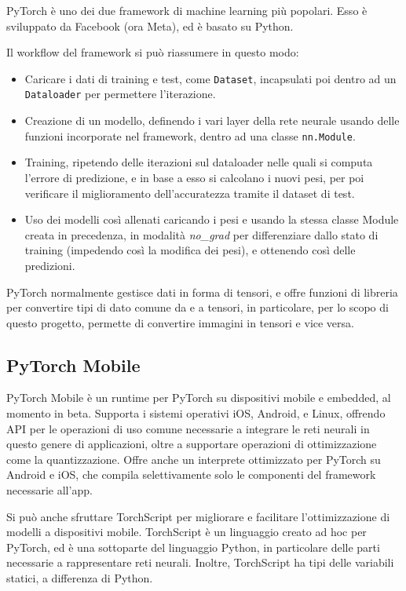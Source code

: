 PyTorch è uno dei due framework di machine learning più popolari.
Esso è sviluppato da Facebook (ora Meta), ed è basato su Python.

Il workflow del framework si può riassumere in questo modo:

\begin{itemize}
    \item Caricare i dati di training e test, come \texttt{Dataset}, 
    incapsulati poi dentro ad un \texttt{Dataloader} per permettere l'iterazione.
    \item Creazione di un modello, definendo i vari layer della rete neurale usando
    delle funzioni incorporate nel framework, dentro ad una classe \texttt{nn.Module}.
    \item Training, ripetendo delle iterazioni sul dataloader nelle quali si computa
    l'errore di predizione, e in base a esso si calcolano i nuovi pesi, per poi verificare
    il miglioramento dell'accuratezza tramite il dataset di test.
    \item Uso dei modelli così allenati caricando i pesi e usando la stessa classe Module
    creata in precedenza, in modalità \emph{no\_grad} per differenziare dallo stato di
    training (impedendo così la modifica dei pesi), e ottenendo così delle predizioni.
\end{itemize}

PyTorch normalmente gestisce dati in forma di tensori, e offre funzioni di libreria per
convertire tipi di dato comune da e a tensori, in particolare, per lo scopo di questo
progetto, permette di convertire immagini in tensori e vice versa.

\subsection{PyTorch Mobile}

PyTorch Mobile è un runtime per PyTorch su dispositivi mobile e embedded, al momento in
beta. Supporta i sistemi operativi iOS, Android, e Linux, offrendo API per le operazioni
di uso comune necessarie a integrare le reti neurali in questo genere di applicazioni,
oltre a supportare operazioni di ottimizzazione come la quantizzazione. Offre anche 
un interprete ottimizzato per PyTorch su Android e iOS, che compila selettivamente solo
le componenti del framework necessarie all'app.

Si può anche sfruttare TorchScript per migliorare e facilitare l'ottimizzazione di modelli
a dispositivi mobile. TorchScript è un linguaggio creato ad hoc per PyTorch, ed è una 
sottoparte del linguaggio Python, in particolare delle parti necessarie a rappresentare reti 
neurali. Inoltre, TorchScript ha tipi delle variabili statici, a differenza di Python.

